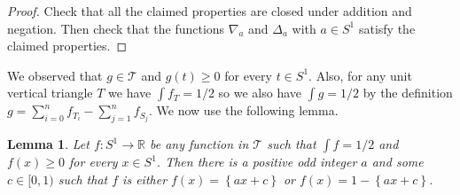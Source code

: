 \documentclass[a4paper]{amsart}
\theoremstyle{plain}
\newtheorem{lemma}{Lemma}
\theoremstyle{definition}
\begin{document}
\begin{proof}
Check that all the claimed properties are closed under addition and negation. Then check that the functions \(\nabla_a\) and \(\Delta_a\) with \(a \in S^1\) satisfy the claimed properties.
\end{proof}

We observed that \(g \in \mathcal{T}\) and \(g(t) \geq 0\) for every \(t \in S^1\). Also, for any unit vertical triangle \(T\) we have \(\int f_T = 1/2\) so we also have \(\int g = 1/2\) by the definition \(g = \sum_{i=0}^n f_{T_i} - \sum_{j=1}^n f_{S_j}\). 
We now use the following lemma.

\begin{lemma}

Let \(f : S^1 \to \mathbb{R}\) be any function in \(\mathcal{T}\) such that \(\int f = 1/2\) and \(f(x) \geq 0\) for every \(x \in S^1\). Then there is a positive odd integer \(a\) and some \(c \in [0, 1)\) such that \(f\) is either \(f(x) = \left\{ ax + c \right\}\) or \(f(x) = 1 - \left\{ ax + c \right\}\).

\label{lem:triangle-unit-area}
\end{lemma}
\end{document}
